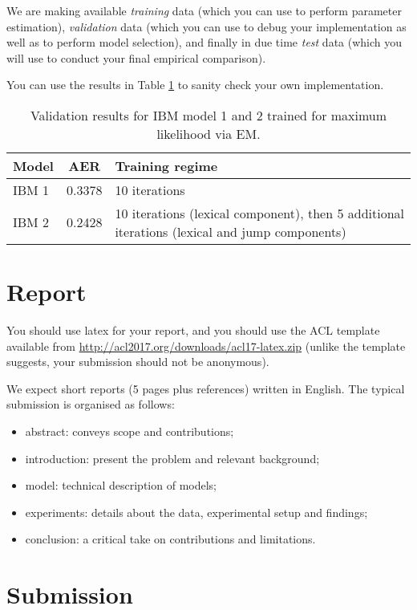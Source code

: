 We are making available \emph{training} data (which you can use to perform parameter estimation), \emph{validation} data (which you can use to debug your implementation as well as to perform model selection), and finally in due time \emph{test} data (which you will use to conduct your final empirical comparison).

You can use the results in Table \ref{tab:validation} to sanity check your own implementation.

\begin{table}\centering
\begin{tabular}{l | c | p{10cm}}
\bf Model & \bf AER & \bf Training regime \\ \hline
IBM 1 & 0.3378 & 10 iterations \\
IBM 2 & 0.2428 & 10 iterations (lexical component), then 5 additional iterations (lexical and jump components) \\ \hline
\end{tabular}
\caption{\label{tab:validation}Validation results for IBM model 1 and 2 trained for maximum likelihood via EM.}
\end{table}

\section{Report}

You should use latex for your report, and you should use the ACL template available from \url{http://acl2017.org/downloads/acl17-latex.zip} (unlike the template suggests, your submission should not be anonymous). 

We expect short reports (5 pages plus references) written in English. The typical submission is organised as follows: 
\begin{itemize}
	\item abstract: conveys scope and contributions;
	\item introduction: present the problem and relevant background;
	\item model: technical description of models;
	\item experiments: details about the data, experimental setup and findings;
	\item conclusion: a critical take on contributions and limitations.
\end{itemize}


\section{Submission}

